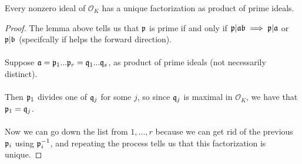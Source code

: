 \begin{theorem}[pg. 112]
Every nonzero ideal of $\mathcal{O}_K$ has a unique factorization as product of prime ideals.
\end{theorem}

\begin{proof}
The lemma above tells us that $\mathfrak{p}$ is prime if and only if $\mathfrak{p} | \mathfrak{a} \mathfrak{b} \implies \mathfrak{p} | \mathfrak{a}$ or $\mathfrak{p} | \mathfrak{b}$ (specifcally if helps the forward direction).\\\\
Suppose $\mathfrak{a} = \mathfrak{p}_1 ... \mathfrak{p}_r = \mathfrak{q}_1 ... \mathfrak{q}_s$, as product of prime ideals (not necessarily distinct).\\\\
Then $\mathfrak{p}_1$ divides one of $\mathfrak{q}_j$ for some $j$, so since $\mathfrak{q}_j$ is maximal in $\mathcal{O}_K$, we have that $\mathfrak{p}_1 = \mathfrak{q}_j$.\\\\
Now we can go down the list from $1, ..., r$ because we can get rid of the previous $\mathfrak{p}_i$ using $\mathfrak{p}_i^{-1}$, and repeating the process tells us that this factorization is unique.
\end{proof}